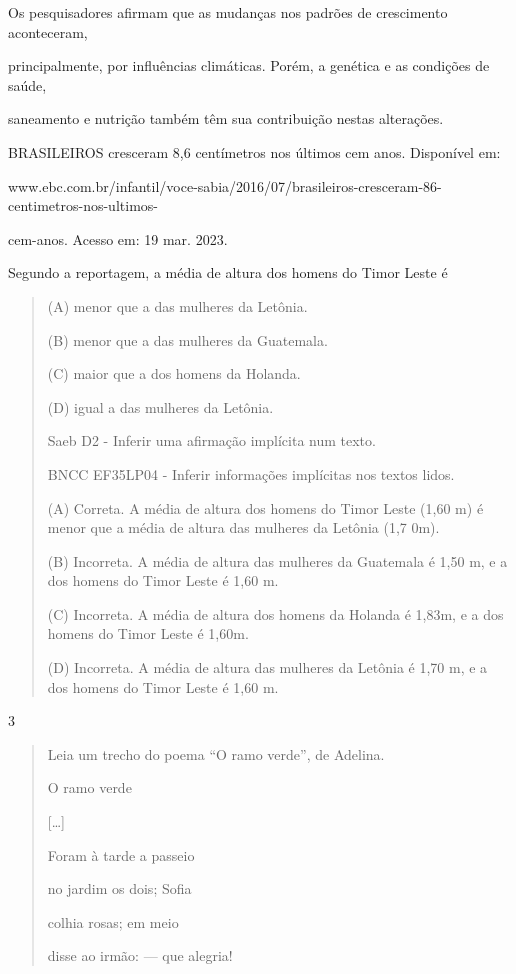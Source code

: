 \begin{itemize}
{{{\begin{itemize}
\begin{itemize}
\begin{itemize}
Os pesquisadores afirmam que as mudanças nos padrões de crescimento
aconteceram,

principalmente, por influências climáticas. Porém, a genética e as
condições de saúde,

saneamento e nutrição também têm sua contribuição nestas alterações.

BRASILEIROS cresceram 8,6 centímetros nos últimos cem anos. Disponível
em:

www.ebc.com.br/infantil/voce-sabia/2016/07/brasileiros-cresceram-86-centimetros-nos-ultimos-

cem-anos. Acesso em: 19 mar. 2023.

Segundo a reportagem, a média de altura dos homens do Timor Leste é

\begin{quote}
(A) menor que a das mulheres da Letônia.

(B) menor que a das mulheres da Guatemala.

(C) maior que a dos homens da Holanda.

(D) igual a das mulheres da Letônia.

Saeb D2 - Inferir uma afirmação implícita num texto.

BNCC EF35LP04 - Inferir informações implícitas nos textos lidos.

(A) Correta. A média de altura dos homens do Timor Leste (1,60 m) é
menor que a média de altura das mulheres da Letônia (1,7 0m).

(B) Incorreta. A média de altura das mulheres da Guatemala é 1,50 m, e a
dos homens do Timor Leste é 1,60 m.

(C) Incorreta. A média de altura dos homens da Holanda é 1,83m, e a dos
homens do Timor Leste é 1,60m.

(D) Incorreta. A média de altura das mulheres da Letônia é 1,70 m, e a
dos homens do Timor Leste é 1,60 m.
\end{quote}

\num{3}

\begin{quote}
Leia um trecho do poema ``O ramo verde'', de Adelina.

O ramo verde

{[}\ldots{}{]}

Foram à tarde a passeio

no jardim os dois; Sofia

colhia rosas; em meio

disse ao irmão: --- que alegria!


\end{quote}
\end{itemize}
\end{itemize}
\end{itemize}}}}
\end{itemize}
